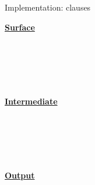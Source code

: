 \documentclass[aspectratio=169]{beamer}
\begin{document}
\begin{frame}[fragile]{Implementation:  clauses}

\begin{minipage}{.33\textwidth}%
\textbf{\underline{Surface}}

\begin{code}[hide]%
\>[0]\AgdaSpace{}%
\AgdaSpace{}%
\<%
\end{code}
\begin{code}%
\>[0][@{}l@{\AgdaIndent{1}}]%
\>[2]\AgdaSpace{}%
\AgdaSymbol{:}\AgdaSpace{}%
\AgdaSpace{}%
\AgdaSpace{}%
\<%
\\
%
\>[2]%
\>[2506I]\AgdaSpace{}%
\AgdaSymbol{=}\AgdaSpace{}%
\<%
\\
\>[.][@{}l@{}]\<[2506I]%
\>[4]\<%
\\
\>[4][@{}l@{\AgdaIndent{0}}]%
\>[6]\AgdaSpace{}%
\AgdaSymbol{=}\AgdaSpace{}%
\<%
\\
%
\>[6]\<%
\end{code}
\end{minipage}\hspace{-1cm}\vrule\hspace{.5cm}
\begin{minipage}{.33\textwidth}%
\textbf{\underline{Intermediate}}

\begin{code}[hide]%
\>[0]\AgdaSpace{}%
\AgdaSpace{}%
\<%
\end{code}
\begin{code}%
\>[0][@{}l@{\AgdaIndent{1}}]%
\>[2]\AgdaSpace{}%
\AgdaSymbol{:}\AgdaSpace{}%
\AgdaSpace{}%
\AgdaSpace{}%
\<%
\\
%
\>[2]\AgdaSpace{}%
\AgdaSpace{}%
\AgdaSymbol{=}\AgdaSpace{}%
\<%
\\
%
\\[\AgdaEmptyExtraSkip]%
%
\>[2]\AgdaSpace{}%
\AgdaSymbol{:}\AgdaSpace{}%
\AgdaSpace{}%
\AgdaSpace{}%
\<%
\\
%
\>[2]\AgdaSpace{}%
\AgdaSpace{}%
\AgdaSymbol{=}\AgdaSpace{}%
\AgdaSpace{}%
\<%
\end{code}
\end{minipage}\hspace{-1cm}\vrule\hspace{.5cm}
\begin{minipage}{.33\textwidth}%
\begin{center}\textbf{\underline{Output}}\end{center}


\end{minipage}
\end{frame}
\end{document}
